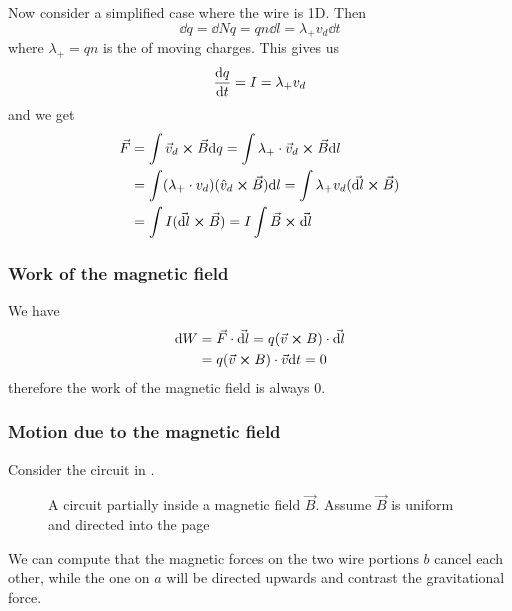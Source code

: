 \documentclass[12pt]{extarticle}
\begin{document}
Now consider a simplified case where the wire is 1D.
Then
\begin{equation}
    \dd q = \dd N q = q n \dd l = \lambda_+ v_d \dd t
\end{equation}
where $\lambda_+ = qn$ is the  of moving charges.
This gives us
\begin{equation}
    \dv{q}{t} = I = \lambda_+ v_d
\end{equation}
and we get
\begin{align}
    \vec F & = \int \vec v_d \cross \vec B \dd q
    = \int \lambda_+ \cdot \vec v_d \cross \vec B \dd l                  \\
           & = \int (\lambda_+ \cdot v_d) (\hat v_d \cross \vec B) \dd l
    = \int \lambda_+ v_d (\vec{\dd l} \cross \vec B)                     \\
           & = \int I (\vec {\dd l} \cross \vec B)
    = I \int \vec B \cross \vec{\dd l}
\end{align}

\subsubsection{Work of the magnetic field}

We have
\begin{align}
    \dd W & = \vec F \cdot \vec{\dd l}
    = q(\vec v \cross B) \cdot \vec{\dd l}          \\
          & = q(\vec v \cross B) \cdot \vec v \dd t
    = 0
\end{align}
therefore the work of the magnetic field is always 0.

\subsubsection{Motion due to the magnetic field}

Consider the circuit in .

\begin{figure}[H]
    \centering
    
    \caption{A circuit partially inside a magnetic field $\vec B$.
        Assume $\vec B$ is uniform and directed into the page}
    \label{fig:work-magnetic}
\end{figure}

We can compute that the magnetic forces on the two wire portions $b$ cancel each other,
while the one on $a$ will be directed upwards and contrast the gravitational force.
\end{document}
